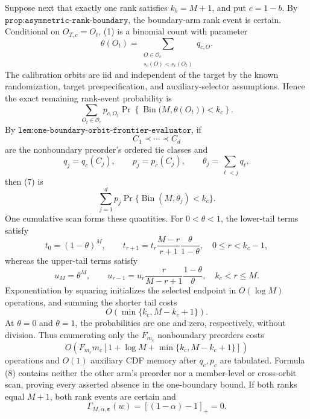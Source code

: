 Suppose next that exactly one rank satisfies \(k_b=M+1\), and put \(c=1-b\). By \(\texttt{prop:asymmetric-rank-boundary}\), the boundary-arm rank event is certain. Conditional on \(O_{T,c}=O_t\), (1) is a binomial count with parameter
\[
\theta(O_t)=\sum_{\substack{O\in\mathcal O_c\\s_c(O)<s_c(O_t)}}q_{c,O}.
\tag{6}
\]
The calibration orbits are iid and independent of the target by the known randomization, target prespecification, and auxiliary-selector assumptions. Hence the exact remaining rank-event probability is
\[
\sum_{O_t\in\mathcal O_c}p_{c,O_t}
 \Pr\!\left\{\operatorname{Bin}\bigl(M,\theta(O_t)\bigr)<k_c\right\}.
\tag{7}
\]
By \(\texttt{lem:one-boundary-orbit-frontier-evaluator}\), if
\[
C_1\prec\cdots\prec C_d
\]
are the nonboundary preorder's ordered tie classes and
\[
q_j=q_c(C_j),\qquad p_j=p_c(C_j),\qquad
\theta_j=\sum_{\ell<j}q_\ell,
\]
then (7) is
\[
\sum_{j=1}^d p_j\Pr\{\operatorname{Bin}(M,\theta_j)<k_c\}.
\tag{8}
\]
One cumulative scan forms these quantities. For \(0<\theta<1\), the lower-tail terms satisfy
\[
t_0=(1-\theta)^M,\qquad
t_{r+1}=t_r\frac{M-r}{r+1}\frac{\theta}{1-\theta},
\quad 0\le r<k_c-1,
\tag{9}
\]
whereas the upper-tail terms satisfy
\[
u_M=\theta^M,\qquad
u_{r-1}=u_r\frac r{M-r+1}\frac{1-\theta}{\theta},
\quad k_c<r\le M.
\tag{10}
\]
Exponentiation by squaring initializes the selected endpoint in \(O(\log M)\) operations, and summing the shorter tail costs
\[
O(\min\{k_c,M-k_c+1\}).
\]
At \(\theta=0\) and \(\theta=1\), the probabilities are one and zero, respectively, without division. Thus enumerating only the \(F_{m_c}\) nonboundary preorders costs
\[
O\!\left(
F_{m_c}m_c
\left[1+\log M+\min\{k_c,M-k_c+1\}\right]
\right)
\tag{11}
\]
operations and \(O(1)\) auxiliary CDF memory after \(q_c,p_c\) are tabulated. Formula (8) contains neither the other arm's preorder nor a member-level or cross-orbit scan, proving every asserted absence in the one-boundary bound. If both ranks equal \(M+1\), both rank events are certain and
\[
\Gamma_{M,\alpha,\boldsymbol\varepsilon}(w)
 =[(1-\alpha)-1]_+=0.
\tag{12}
\]

